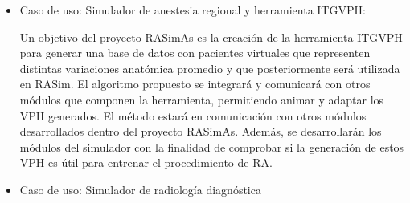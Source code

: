 \begin{itemize}





\begin{itemize}
    \item 	Caso de uso: Simulador de anestesia regional y herramienta \ac{ITGVPH}:
    
    Un objetivo del proyecto \ac{RASimAs} es la creación de la herramienta \ac{ITGVPH} para generar una base de datos con pacientes virtuales que representen distintas variaciones anatómica promedio y que posteriormente será utilizada en \ac{RASim}.
    El algoritmo propuesto se integrará y comunicará con otros módulos que componen la herramienta, permitiendo animar y adaptar los \ac{VPH} generados. El método estará en comunicación con otros módulos desarrollados dentro del proyecto \ac{RASimAs}. Además, se desarrollarán los módulos del simulador con la finalidad de comprobar si la generación de estos \ac{VPH} es útil para entrenar el procedimiento de \ac{RA}.
    


    

    \item Caso de uso: Simulador de radiología diagnóstica


\end{itemize}
\end{itemize}
